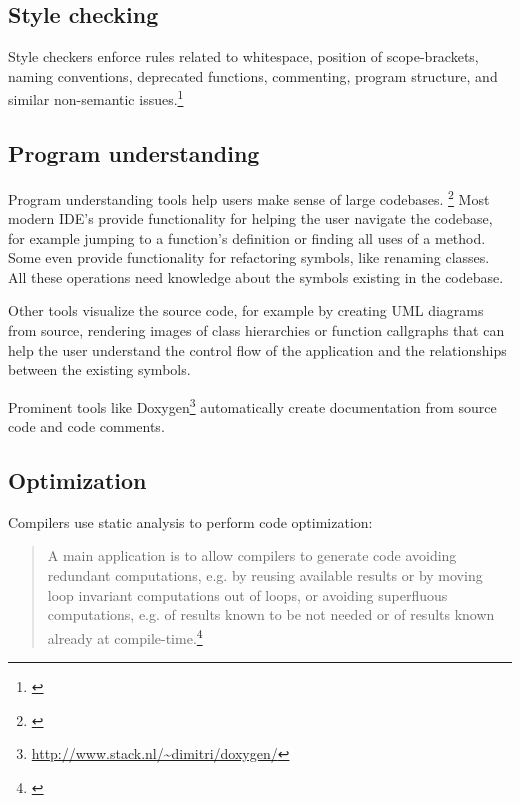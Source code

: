 \subsection{Style checking}

Style checkers enforce rules related to whitespace, position of scope-brackets, naming conventions, deprecated functions, commenting, program structure, and similar non-semantic issues.\footnote{\citep[25]{SecureProgramming}}


\subsection{Program understanding}

Program understanding tools help users make sense of large codebases. \footnote{\citep[27]{SecureProgramming}} Most modern IDE's provide functionality for helping the user navigate the codebase, for example jumping to a function's definition or finding all uses of a method. Some even provide functionality for refactoring symbols, like renaming classes. All these operations need knowledge about the symbols existing in the codebase.

Other tools visualize the source code, for example by creating UML diagrams from source, rendering images of class hierarchies or function callgraphs that can help the user understand the control flow of the application and the relationships between the existing symbols.


Prominent tools like Doxygen\footnote{\url{http://www.stack.nl/~dimitri/doxygen/}} automatically create documentation from source code and code comments.

\subsection{Optimization}

Compilers use static analysis to perform code optimization:

\begin{quotation}
A main application is to allow compilers to generate code avoiding redundant computations, e.g. by reusing available results or by moving loop invariant computations out of loops, or avoiding superfluous computations, e.g. of results known to be not needed or of results known already at compile-time.\footnote{\citep[1]{ProgramAnalysis}}
\end{quotation}

